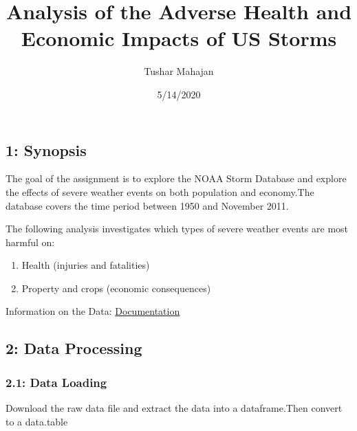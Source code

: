 \documentclass[
]{article}
\title{Analysis of the Adverse Health and Economic Impacts of US Storms}
\author{Tushar Mahajan}
\date{5/14/2020}
\newenvironment{Shaded}{\begin{snugshade}}{\end{snugshade}}
\newcommand{\CommentTok}[1]{\textcolor[rgb]{0.56,0.35,0.01}{\textit{#1}}}
\newcommand{\DataTypeTok}[1]{\textcolor[rgb]{0.13,0.29,0.53}{#1}}
\newcommand{\KeywordTok}[1]{\textcolor[rgb]{0.13,0.29,0.53}{\textbf{#1}}}
\newcommand{\NormalTok}[1]{#1}
\newcommand{\StringTok}[1]{\textcolor[rgb]{0.31,0.60,0.02}{#1}}
\providecommand{\tightlist}{%
  \setlength{\itemsep}{0pt}\setlength{\parskip}{0pt}}
\begin{document}
\maketitle

\hypertarget{synopsis}{%
\subsection{1: Synopsis}\label{synopsis}}

The goal of the assignment is to explore the NOAA Storm Database and
explore the effects of severe weather events on both population and
economy.The database covers the time period between 1950 and November
2011.

The following analysis investigates which types of severe weather events
are most harmful on:

\begin{enumerate}
\def\labelenumi{\arabic{enumi}.}
\tightlist
\item
  Health (injuries and fatalities)
\item
  Property and crops (economic consequences)
\end{enumerate}

Information on the Data:
\href{https://d396qusza40orc.cloudfront.net/repdata\%2Fpeer2_doc\%2Fpd01016005curr.pdf}{Documentation}

\hypertarget{data-processing}{%
\subsection{2: Data Processing}\label{data-processing}}

\hypertarget{data-loading}{%
\subsubsection{2.1: Data Loading}\label{data-loading}}

Download the raw data file and extract the data into a dataframe.Then
convert to a data.table

\begin{Shaded}
\end{Shaded}
\end{document}
